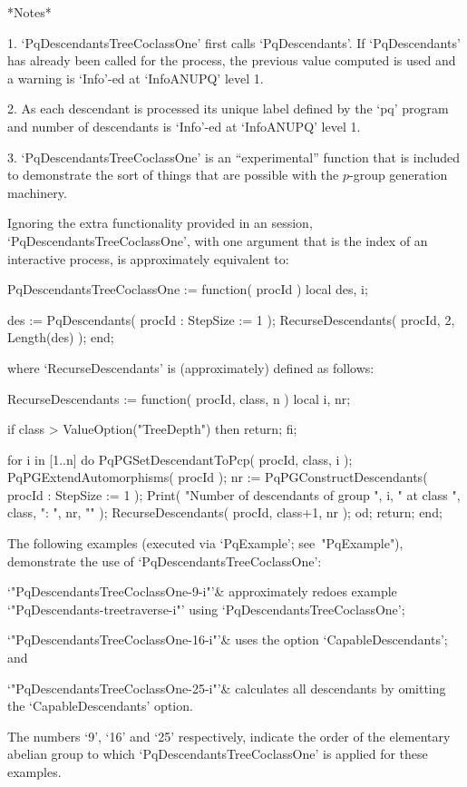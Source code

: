 *Notes*

\beginlist%

\item{1.}
`PqDescendantsTreeCoclassOne'    first    calls    `PqDescendants'.    If
`PqDescendants' has already been called for  the  process,  the  previous
value computed is used and a warning is `Info'-ed at `InfoANUPQ' level 1.

\item{2.}
As each descendant is processed its unique  label  defined  by  the  `pq'
program and number of descendants is `Info'-ed at `InfoANUPQ' level 1.

\item{3.}
`PqDescendantsTreeCoclassOne' is an  ``experimental''  function  that  is
included to demonstrate the sort of things that  are  possible  with  the
$p$-group generation machinery.

\endlist

Ignoring  the  extra  functionality  provided  in  an  {\XGAP}   session,
`PqDescendantsTreeCoclassOne', with one argument that is the index of  an
interactive {\ANUPQ} process, is approximately equivalent to:

\begintt
PqDescendantsTreeCoclassOne := function( procId )
    local   des,  i;

    des := PqDescendants( procId : StepSize := 1 );
    RecurseDescendants( procId, 2, Length(des) );
end;
\endtt

where `RecurseDescendants' is (approximately) defined as follows:

\begintt
RecurseDescendants := function( procId, class, n )
    local   i,  nr;

    if class > ValueOption("TreeDepth") then return; fi;

    for i in [1..n] do
        PqPGSetDescendantToPcp( procId, class, i );
        PqPGExtendAutomorphisms( procId );
        nr := PqPGConstructDescendants( procId : StepSize := 1 );
        Print( "Number of descendants of group ", i,
               " at class ", class, ": ", nr, "\n" );
        RecurseDescendants( procId, class+1, nr );
    od;
    return;
end;
\endtt

The  following  examples  (executed  via  `PqExample';  see~"PqExample"),
demonstrate the use of `PqDescendantsTreeCoclassOne':

\beginitems

`"PqDescendantsTreeCoclassOne-9-i"'&
approximately  redoes  example   `"PqDescendants-treetraverse-i"'   using
`PqDescendantsTreeCoclassOne';

`"PqDescendantsTreeCoclassOne-16-i"'&
uses the option `CapableDescendants'; and

`"PqDescendantsTreeCoclassOne-25-i"'&
calculates all descendants by omitting the `CapableDescendants' option.

\enditems

The numbers `9', `16' and `25' respectively, indicate the  order  of  the
elementary  abelian  group  to  which  `PqDescendantsTreeCoclassOne'   is
applied for these examples.

